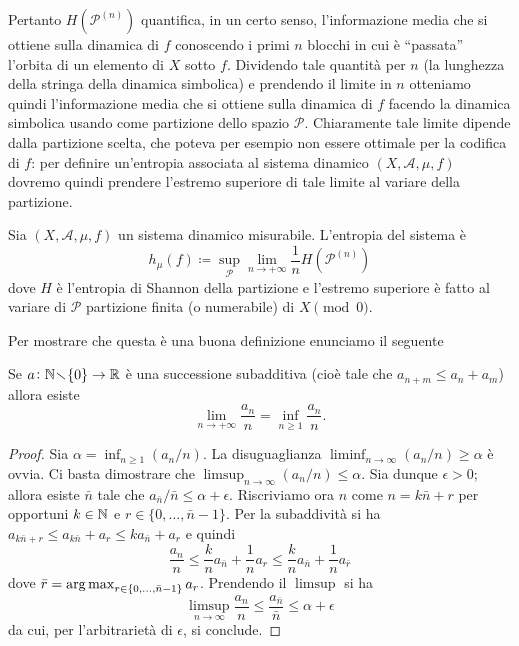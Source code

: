 Pertanto $ H(\mathcal{P}^{(n)}) $ quantifica, in un certo senso, l'informazione media che si ottiene sulla dinamica di $ f $ conoscendo i primi $ n $ blocchi in cui è ``passata'' l'orbita di un elemento di $ X $ sotto $ f $. Dividendo tale quantità per $ n $ (la lunghezza della stringa della dinamica simbolica) e prendendo il limite in $ n $ otteniamo quindi l'informazione media che si ottiene sulla dinamica di $ f $ facendo la dinamica simbolica usando come partizione dello spazio $ \mathcal{P} $. Chiaramente tale limite dipende dalla partizione scelta, che poteva per esempio non essere ottimale per la codifica di $ f $: per definire un'entropia associata al sistema dinamico $ (X, \mathcal{A}, \mu, f) $ dovremo quindi prendere l'estremo superiore di tale limite al variare della partizione.

\begin{definition}
    Sia $ (X, \mathcal{A}, \mu, f) $ un sistema dinamico misurabile. L'entropia del sistema è
    \[
        h_\mu(f) \coloneqq \sup_\mathcal{P} {\lim_{n \to +\infty} \frac{1}{n}H(\mathcal{P}^{(n)})}
    \]
    dove $ H $ è l'entropia di Shannon della partizione e l'estremo superiore è fatto al variare di $ \mathcal{P} $ partizione finita (o numerabile) di $ X \pmod{0} $.
\end{definition}
Per mostrare che questa è una buona definizione enunciamo il seguente
\begin{lemma}[Fekete] \label{lem:fekete}
    Se $ a \colon \mathbb{N}\!\smallsetminus\!\{0\} \to \mathbb{R} $ è una successione subadditiva (cioè tale che $ a_{n+m} \leq a_n + a_m $) allora esiste
    \[
        \lim_{n\to+\infty} \frac{a_n}{n} = \inf_{n\geq1}\frac{a_n}{n}.
    \]
\end{lemma}
\begin{proof}
    Sia $ \alpha = \inf_{n\geq1} (a_n/n) $. La disuguaglianza $ \liminf_{n\to\infty} (a_n/n) \geq \alpha $ è ovvia. Ci basta dimostrare che $ \limsup_{n\to\infty} (a_n/n) \leq \alpha $. Sia dunque $ \epsilon > 0 $; allora esiste $ \bar{n} $ tale che $ a_{\bar{n}}/\bar{n} \leq \alpha + \epsilon $. Riscriviamo ora $ n $ come $ n = k \bar{n} + r $ per opportuni $ k\in\mathbb{N} $ e $ r\in\{0,\ldots, \bar{n}-1\} $. Per la subaddività si ha $ a_{k\bar{n}+r} \leq a_{k\bar{n}} + a_r \leq ka_{\bar{n}} + a_r $ e quindi
    \[ \frac{a_n}{n} \leq \frac{k}{n}a_{\bar{n}} + \frac{1}{n}a_r \leq \frac{k}{n}a_{\bar{n}} + \frac{1}{n} a_{\bar{r}} \]
    dove $ \bar{r} = \operatorname*{arg\, max}_{r\in\{ 0,\ldots, \bar{n}-1 \}} a_r $. Prendendo il $ \limsup $ si ha
    \[ \limsup_{n\to\infty} \frac{a_n}{n} \leq \frac{a_{\bar{n}}}{\bar{n}} \leq \alpha + \epsilon \]
    da cui, per l'arbitrarietà di $ \epsilon $, si conclude.
\end{proof}
